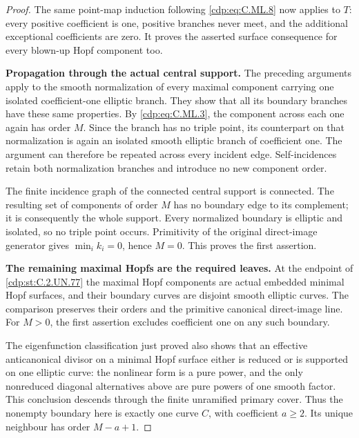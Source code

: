 \begin{proof}
The same point-map induction following \eqref{cdp:eq:C.ML.8}
now applies to \(T\): every positive coefficient
is one, positive branches never meet, and the
additional exceptional coefficients are zero.
It proves the asserted surface consequence for
every blown-up Hopf component too.

\par\medskip\noindent\textbf{Propagation through the actual central support.}
The preceding arguments apply to the smooth
normalization of every maximal component carrying
one isolated coefficient-one elliptic branch.
They show that all its boundary branches have
these same properties. By \eqref{cdp:eq:C.ML.3}, the component
across each one again has order \(M\). Since the
branch has no triple point, its counterpart on
that normalization is again an isolated smooth
elliptic branch of coefficient one. The argument
can therefore be repeated across every incident
edge. Self-incidences retain both normalization
branches and introduce no new component order.

The finite incidence graph of the connected
central support is connected. The resulting
set of components of order \(M\) has no boundary
edge to its complement; it is consequently the
whole support. Every normalized boundary is
elliptic and isolated, so no triple point occurs.
Primitivity of the original direct-image generator
gives \(\min_i k_i=0\), hence \(M=0\).
This proves the first assertion.

\par\medskip\noindent\textbf{The remaining maximal Hopfs are the required leaves.}
At the endpoint of \ref{cdp:st:C.2.UN.77} the maximal Hopf components
are actual embedded minimal Hopf surfaces, and
their boundary curves are disjoint smooth elliptic
curves. The comparison preserves their orders and
the primitive canonical direct-image line. For
\(M>0\), the first assertion excludes coefficient
one on any such boundary.

The eigenfunction classification just proved
also shows that an effective anticanonical divisor
on a minimal Hopf surface either is reduced or
is supported on one elliptic curve: the nonlinear
form is a pure power, and the only nonreduced
diagonal alternatives above are pure powers of
one smooth factor. This conclusion descends
through the finite unramified primary cover.
Thus the nonempty boundary here is exactly one
curve \(C\), with coefficient \(a\ge2\).
Its unique neighbour has order \(M-a+1\).


\end{proof}

